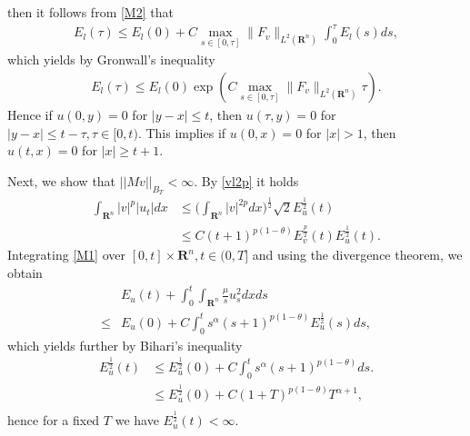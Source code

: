\documentclass[review]{elsarticle}
\newcommand{\R}{\mathbf{R}}
\begin{document}
then it follows from \eqref{M2} that
\begin{equation}\label{M4}
\begin{aligned}
E_l(\tau)\le E_l(0)+C\max_{s\in [0, \tau]}\|F_v\|_{L^2(\R^n)}\int_0^\tau E_l(s)ds,
\end{aligned}
\end{equation}
which yields by Gronwall's inequality
\begin{equation}\label{M5}
\begin{aligned}
E_l(\tau)\le E_l(0)\exp\left(C\max_{s\in [0, \tau]}\|F_v\|_{L^2(\R^n)}\tau\right).
\end{aligned}
\end{equation}
Hence if $u(0, y)=0$ for $|y-x|\le t$, then $u(\tau, y)=0$ for $|y-x|\le t-\tau, \tau\in [0, t)$. This implies if $u(0, x)=0$ for $|x|>1$, then $u(t, x)=0$ for $|x|\ge t+1$.


Next, we show that $||Mv||_{B_{T}}<\infty$.
By \eqref{vl2p} it holds
\begin{equation}\label{vput}
\begin{aligned}
\int_{\R^n}|v|^p|u_t|dx&\leq\Bigg(\int_{\R^n}|v|^{2p}dx\Bigg)^{\frac{1}{2}}\sqrt{2}E_u^{\frac{1}{2}}(t)\\
&\leq C(t+1)^{p(1-\theta)}E_v^{\frac{p}{2}}(t)E_u^{\frac{1}{2}}(t).
\end{aligned}
\end{equation}
Integrating \eqref{M1} over $[0, t]\times\R^n, t\in (0, T]$ and using the divergence theorem, we obtain
\begin{equation}\label{divesti}
\begin{aligned}
&E_u(t)+\int_{0}^{t}\int_{\R^n}\frac{\mu}{s}u_s^2dxds\\
\leq& E_u(0)+C\int_{0}^ts^\alpha (s+1)^{p(1-\theta)}E_u^{\frac{1}{2}}(s)ds,
\end{aligned}
\end{equation}
which yields further by Bihari's inequality
\begin{equation}\label{divesti12}
\begin{aligned}
E_u^{\frac{1}{2}}(t)&\leq E_u^{\frac{1}{2}}(0)+C\int_{0}^ts^\alpha (s+1)^{p(1-\theta)}ds.\\
&\leq E_u^{\frac{1}{2}}(0)+C(1+T)^{p(1-\theta)}T^{\alpha+1},\\
\end{aligned}
\end{equation}
hence for a fixed $T$ we have $E_u^{\frac{1}{2}}(t)<\infty$.
\end{document}
